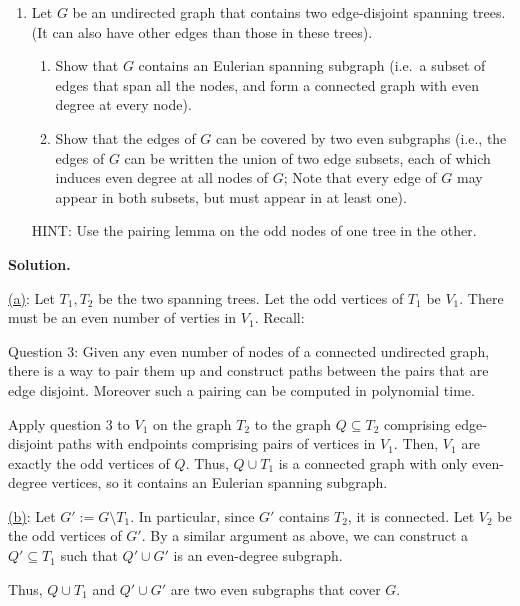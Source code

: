 \documentclass[11pt,letterpaper]{article}
\theoremstyle{definition}
\newcommand{\solution}{\medskip\noindent\textbf{Solution.}\par\medskip}
\begin{document}


\begin{enumerate}[resume=q]
\item[9.*] Let $G$ be an undirected graph that contains two edge-disjoint spanning trees. (It can also have other edges than those in these trees).
\begin{enumerate}
\item Show that $G$ contains an Eulerian spanning subgraph (i.e.\ a subset of edges that span all the nodes, and form a connected graph with even degree at every node).
\item Show that the edges of $G$ can be covered by two even subgraphs (i.e., the edges of $G$ can be written the union of two edge subsets, each of which induces even degree at all nodes of $G$; Note that every edge of $G$ may appear in both subsets, but must appear in at least one).
\end{enumerate}
HINT: Use the pairing lemma on the odd nodes of one tree in the other.
\end{enumerate}

\solution
\ul{(a)}:
Let $T_1,T_2$ be the two spanning trees.
Let the odd vertices of $T_1$ be $V_1$.
There must be an even number of verties in $V_1$. 
Recall: 

Question 3: Given any even number of nodes of a connected undirected graph, there is a way to pair them up and construct paths between the pairs that are edge disjoint. Moreover such a pairing can be computed in polynomial time.

Apply question 3 to $V_1$ on the graph $T_2$ to the graph $Q\subseteq T_2$ comprising edge-disjoint paths with endpoints comprising pairs of vertices in $V_1$.
Then, $V_1$ are exactly the odd vertices of $Q$.
Thus, $Q\cup T_1$ is a connected graph with only even-degree vertices, so it contains an Eulerian spanning subgraph.

\ul{(b)}:
Let $G':= G\setminus T_1$. 
In particular, since $G'$ contains $T_2$, it is connected.
Let $V_2$ be the odd vertices of $G'$.
By a similar argument as above, we can construct a $Q'\subseteq T_1$ such that $Q'\cup G'$ is an even-degree subgraph.

Thus, $Q\cup T_1$ and $Q'\cup G'$ are two even subgraphs that cover $G$.
\end{document}
